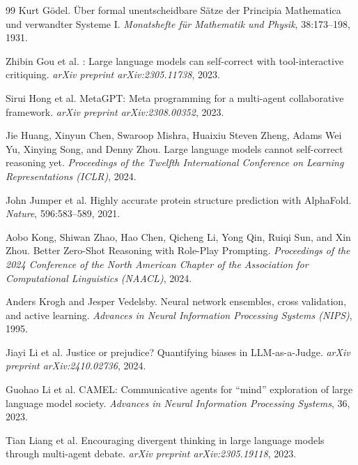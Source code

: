 \documentclass[11pt]{article}
\begin{document}
\begin{thebibliography}{99}
Kurt Gödel.
\newblock Über formal unentscheidbare Sätze der Principia Mathematica und verwandter Systeme I.
\newblock \emph{Monatshefte für Mathematik und Physik}, 38:173--198, 1931.

Zhibin Gou et al.
: Large language models can self-correct with tool-interactive critiquing.
\newblock \emph{arXiv preprint arXiv:2305.11738}, 2023.

Sirui Hong et al.
\newblock MetaGPT: Meta programming for a multi-agent collaborative framework.
\newblock \emph{arXiv preprint arXiv:2308.00352}, 2023.

Jie Huang, Xinyun Chen, Swaroop Mishra, Huaixiu Steven Zheng, Adams Wei Yu, Xinying Song, and Denny Zhou.
\newblock Large language models cannot self-correct reasoning yet.
\newblock \emph{Proceedings of the Twelfth International Conference on Learning Representations (ICLR)}, 2024.

John Jumper et al.
\newblock Highly accurate protein structure prediction with AlphaFold.
\newblock \emph{Nature}, 596:583--589, 2021.

Aobo Kong, Shiwan Zhao, Hao Chen, Qicheng Li, Yong Qin, Ruiqi Sun, and Xin Zhou.
\newblock Better Zero-Shot Reasoning with Role-Play Prompting.
\newblock \emph{Proceedings of the 2024 Conference of the North American Chapter of the Association for Computational Linguistics (NAACL)}, 2024.

Anders Krogh and Jesper Vedelsby.
\newblock Neural network ensembles, cross validation, and active learning.
\newblock \emph{Advances in Neural Information Processing Systems (NIPS)}, 1995.

Jiayi Li et al.
\newblock Justice or prejudice? Quantifying biases in LLM-as-a-Judge.
\newblock \emph{arXiv preprint arXiv:2410.02736}, 2024.

Guohao Li et al.
\newblock CAMEL: Communicative agents for ``mind'' exploration of large language model society.
\newblock \emph{Advances in Neural Information Processing Systems}, 36, 2023.

Tian Liang et al.
\newblock Encouraging divergent thinking in large language models through multi-agent debate.
\newblock \emph{arXiv preprint arXiv:2305.19118}, 2023.


\end{thebibliography}
\end{document}
